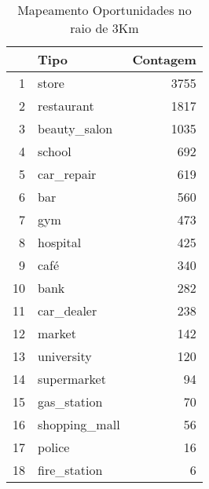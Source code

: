 \begin{table}[h]
    \centering
    \caption{Mapeamento Oportunidades no raio de 3Km}

    \begin{tabular}{rlr}
        & Tipo & Contagem \\ 
        \hline

        1 & store & 3755 \\ 
          2 & restaurant & 1817 \\ 
          3 & beauty\_salon & 1035 \\ 
          4 & school & 692 \\ 
          5 & car\_repair & 619 \\ 
          6 & bar & 560 \\ 
          7 & gym & 473 \\ 
          8 & hospital & 425 \\ 
          9 & café & 340 \\ 
          10 & bank & 282 \\ 
          11 & car\_dealer & 238 \\ 
          12 & market & 142 \\ 
          13 & university & 120 \\ 
          14 & supermarket &  94 \\ 
          15 & gas\_station &  70 \\ 
          16 & shopping\_mall &  56 \\ 
          17 & police &  16 \\ 
          18 & fire\_station &   6 \\ 
        
           \hline
    \end{tabular}
    \label{tab_oportunidades}
\end{table}



    